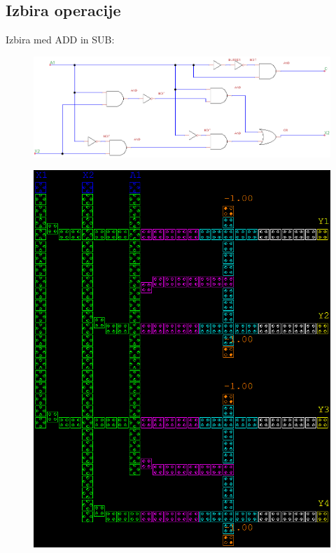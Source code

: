 \documentclass[seminar, slovene]{FRIreport}
\begin{document}
\begin{minipage}[H]{16cm}
\subsection{Izbira operacije}
Izbira med ADD in SUB:\\
\begin{figure}[H]
\begin{center}
\includegraphics[width=13cm]{vezja/img/demuxmux}
\end{center}
\end{figure}
\begin{figure}[H]
\begin{center}
\includegraphics[width=13cm]{qca/img/demuxmux}
\end{center}
\end{figure}
\end{minipage}
\end{document}
